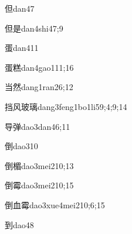 \begin{verbete}{但}{dan4}{7}
\end{verbete}

\begin{verbete}{但是}{dan4shi4}{7;9}
\end{verbete}

\begin{verbete}{蛋}{dan4}{11}
\end{verbete}

\begin{verbete}{蛋糕}{dan4gao1}{11;16}
\end{verbete}

\begin{verbete}{当然}{dang1ran2}{6;12}
\end{verbete}

\begin{verbete}{挡风玻璃}{dang3feng1bo1li5}{9;4;9;14}
\end{verbete}

\begin{verbete}{导弹}{dao3dan4}{6;11}
\end{verbete}

\begin{verbete}{倒}{dao3}{10}
\end{verbete}

\begin{verbete}{倒楣}{dao3mei2}{10;13}
\end{verbete}

\begin{verbete}{倒霉}{dao3mei2}{10;15}
\end{verbete}

\begin{verbete}{倒血霉}{dao3xue4mei2}{10;6;15}
\end{verbete}

\begin{verbete}{到}{dao4}{8}
\end{verbete}

